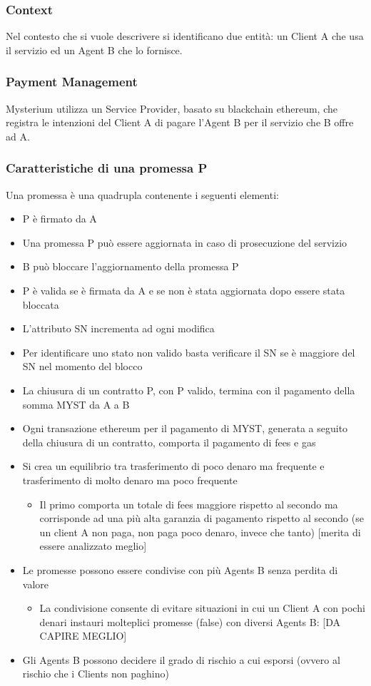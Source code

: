 \documentclass[]{article}
\begin{document}
	\subsubsection{Context}
	Nel contesto che si vuole descrivere si identificano due entità: un Client A che usa il servizio ed un Agent B che lo fornisce.	
	\subsubsection{Payment Management}
	Mysterium utilizza un Service Provider, basato su blackchain ethereum, che registra le intenzioni del Client A di pagare l’Agent B per il servizio che B offre ad A.	
	
	\subsubsection{Caratteristiche di una promessa P}
	Una promessa è una quadrupla contenente i seguenti elementi:
	
	\begin{itemize}
	\item P è firmato da A
	\item Una promessa P può essere aggiornata in caso di prosecuzione del servizio
	\item B può bloccare l’aggiornamento della promessa P
	\item P è valida se è firmata da A e se non è stata aggiornata dopo essere stata bloccata
	\item L’attributo SN incrementa ad ogni modifica
	\item Per identificare uno stato non valido basta verificare il SN se è maggiore del SN nel momento del blocco
	\item La chiusura di un contratto P, con P valido, termina con il pagamento della somma MYST da A a B
	\item Ogni transazione ethereum per il pagamento di MYST, generata a seguito della chiusura di un contratto, comporta il pagamento di fees e gas
	\item Si crea un equilibrio tra trasferimento di poco denaro ma frequente e trasferimento di molto denaro ma poco frequente
	\begin{itemize}
	\item Il primo comporta un totale di fees maggiore rispetto al secondo ma corrisponde ad una più alta garanzia di pagamento rispetto al secondo (se un client A non paga, non paga poco denaro, invece che tanto) [merita di essere analizzato meglio]
	\end{itemize}
	\item Le promesse possono essere condivise con più Agents B senza perdita di valore
	\begin{itemize}
	\item La condivisione consente di evitare situazioni in cui un Client A con pochi denari instauri molteplici promesse (false) con diversi Agents B: [DA CAPIRE MEGLIO]
	\end{itemize}
	\item Gli Agents B possono decidere il grado di rischio a cui esporsi (ovvero al rischio che i Clients non paghino)
	\end{itemize}	
\end{document}
